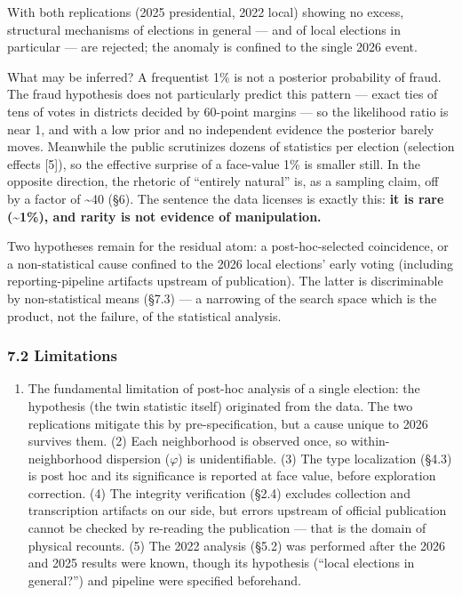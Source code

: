 \documentclass[
  11pt,
]{article}
\providecommand{\tightlist}{%
  \setlength{\itemsep}{0pt}\setlength{\parskip}{0pt}}
\begin{document}
With both replications (2025 presidential, 2022 local) showing no
excess, structural mechanisms of elections in general --- and of local
elections in particular --- are rejected; the anomaly is confined to the
single 2026 event.

What may be inferred? A frequentist 1\% is not a posterior probability
of fraud. The fraud hypothesis does not particularly predict this
pattern --- exact ties of tens of votes in districts decided by 60-point
margins --- so the likelihood ratio is near 1, and with a low prior and
no independent evidence the posterior barely moves. Meanwhile the public
scrutinizes dozens of statistics per election (selection effects
{[}5{]}), so the effective surprise of a face-value 1\% is smaller
still. In the opposite direction, the rhetoric of ``entirely natural''
is, as a sampling claim, off by a factor of \textasciitilde40 (§6). The
sentence the data licenses is exactly this: \textbf{it is rare
(\textasciitilde1\%), and rarity is not evidence of manipulation.}

Two hypotheses remain for the residual atom: a post-hoc-selected
coincidence, or a non-statistical cause confined to the 2026 local
elections' early voting (including reporting-pipeline artifacts upstream
of publication). The latter is discriminable by non-statistical means
(§7.3) --- a narrowing of the search space which is the product, not the
failure, of the statistical analysis.

\subsubsection{7.2 Limitations}\label{limitations}

\begin{enumerate}
\def\labelenumi{(\arabic{enumi})}
\tightlist
\item
  The fundamental limitation of post-hoc analysis of a single election:
  the hypothesis (the twin statistic itself) originated from the data.
  The two replications mitigate this by pre-specification, but a cause
  unique to 2026 survives them. (2) Each neighborhood is observed once,
  so within-neighborhood dispersion (\(\varphi\)) is unidentifiable. (3)
  The type localization (§4.3) is post hoc and its significance is
  reported at face value, before exploration correction. (4) The
  integrity verification (§2.4) excludes collection and transcription
  artifacts on our side, but errors upstream of official publication
  cannot be checked by re-reading the publication --- that is the domain
  of physical recounts. (5) The 2022 analysis (§5.2) was performed after
  the 2026 and 2025 results were known, though its hypothesis (``local
  elections in general?'') and pipeline were specified beforehand.
\end{enumerate}
\end{document}
